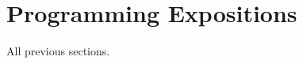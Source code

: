 \documentclass[../../Problems]{subfiles}
\begin{document}
\section{Programming Expositions}
\begin{topics}
All previous sections.
\end{topics}




\end{document}
